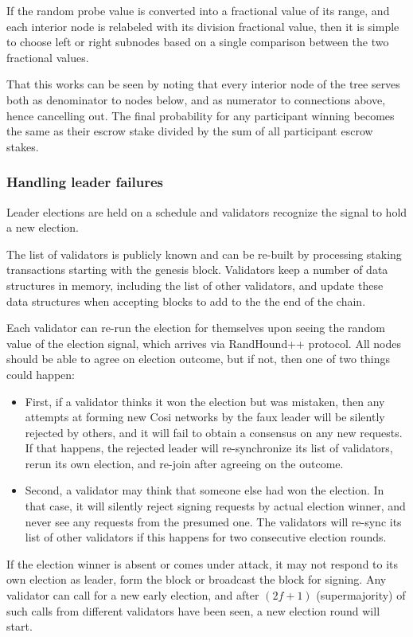 \documentclass[a4paper, 10pt, conference]{ieeeconf}
\begin{document}
If the random probe value is converted into a fractional value of its range, and each interior node is relabeled with its division fractional value, then it is simple to choose left or right subnodes based on a single comparison between the two fractional values.

That this works can be seen by noting that every interior node of the tree serves both as denominator to nodes below, and as numerator to connections above, hence cancelling out. The final probability for any participant winning becomes the same as their escrow stake divided by the sum of all participant escrow stakes.

\subsubsection{Handling leader failures} Leader elections are held on a schedule and validators recognize the signal to hold a new election. 

The list of validators is publicly known and can be re-built by processing staking transactions starting with the genesis block. Validators keep a number of data structures in memory, including the list of other validators, and update these data structures when accepting blocks to add to the the end of the chain.

Each validator can re-run the election for themselves upon seeing the random value of the election signal, which arrives via RandHound++ protocol. All nodes should be able to agree on election outcome, but if not, then one of two things could happen: 

\begin{itemize}
	\item{First, if a validator thinks it won the election but was mistaken, then any attempts at forming new Cosi networks by the faux leader will be silently rejected by others, and it will fail to obtain a consensus on any new requests. If that happens, the rejected leader will re-synchronize its list of validators, rerun its own election, and re-join after agreeing on the outcome.} 
	\item{Second, a validator may think that someone else had won the election. In that case, it will silently reject signing requests by actual election winner, and never see any requests from the presumed one. The validators will re-sync its list of other validators if this happens for two consecutive election rounds.}
\end{itemize}

If the election winner is absent or comes under attack, it may not respond to its own election as leader, form the block or broadcast the block for signing. Any validator can call for a new early election, and after $(2 f+1)$ (supermajority) of such calls from different validators have been seen, a new election round will start.
\end{document}

